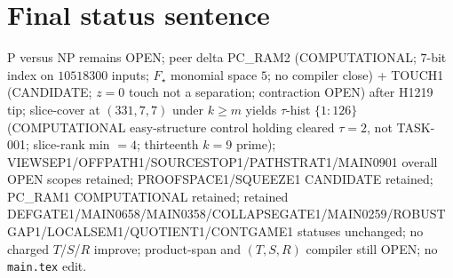 \documentclass[11pt]{article}
\begin{document}
\section*{Final status sentence}
P versus NP remains OPEN; peer delta PC\_RAM2 (COMPUTATIONAL; $7$-bit index on $10518300$ inputs; $F_\star$ monomial space $5$; no compiler close) + TOUCH1 (CANDIDATE; $z{=}0$ touch not a separation; contraction OPEN) after H1219 tip; slice-cover at $(331,7,7)$ under $k{\ge}m$ yields $\tau$-hist $\{1{:}126\}$ (COMPUTATIONAL easy-structure control holding cleared $\tau{=}2$, not TASK-001; slice-rank min $=4$; thirteenth $k{=}9$ prime); VIEWSEP1/OFFPATH1/SOURCESTOP1/PATHSTRAT1/MAIN0901 overall OPEN scopes retained; PROOFSPACE1/SQUEEZE1 CANDIDATE retained; PC\_RAM1 COMPUTATIONAL retained; retained DEFGATE1/MAIN0658/MAIN0358/COLLAPSEGATE1/MAIN0259/ROBUSTGAP1/LOCALSEM1/QUOTIENT1/CONTGAME1 statuses unchanged; no charged $T$/$S$/$R$ improve; product-span and $(T,S,R)$ compiler still OPEN; no \texttt{main.tex} edit.
\end{document}
